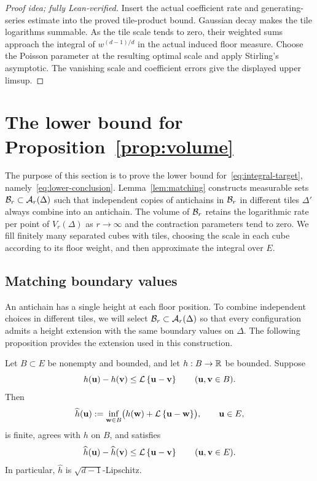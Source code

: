 \documentclass[11pt,letterpaper]{article}
\begin{document}
\begin{proof}[Proof idea; fully Lean-verified]
Insert the actual coefficient rate and generating-series estimate into the proved tile-product bound. Gaussian decay makes the tile logarithms summable. As the tile scale tends to zero, their weighted sums approach the integral of $w^{(d-1)/d}$ in the actual induced floor measure. Choose the Poisson parameter at the resulting optimal scale and apply Stirling's asymptotic. The vanishing scale and coefficient errors give the displayed upper limsup.
\end{proof}

\section{The lower bound for Proposition~\ref{prop:volume}}\label{sec:lower-bound}

The purpose of this section is to prove the lower bound for~\eqref{eq:integral-target}, namely~\eqref{eq:lower-conclusion}.
Lemma~\ref{lem:matching} constructs measurable sets $\mathcal B_r\subset\mathcal A_r(\Delta)$ such that independent copies of antichains in $\mathcal B_r$ in different tiles $\Delta'$ always combine into an antichain. The volume of $\mathcal B_r$ retains the logarithmic rate per point of $V_r(\Delta)$ as $r\to\infty$ and the contraction parameters tend to zero. We fill finitely many separated cubes with tiles, choosing the scale in each cube according to its floor weight, and then approximate the integral over $E$.

\subsection{Matching boundary values}

An antichain has a single height at each floor position. To combine independent choices in different tiles, we will select $\mathcal B_r\subset\mathcal A_r(\Delta)$ so that every configuration admits a height extension with the same boundary values on $\Delta$. The following proposition provides the extension used in this construction.


\begin{proposition}\label{prop:extension}
      Let $B\subset E$ be nonempty and bounded, and let $h:B\to\mathbb R$ be bounded. Suppose
      \begin{equation}\label{eq:height-data}
            h(\mathbf u)-h(\mathbf v)\le\mathcal L\left\{\mathbf u-\mathbf v\right\} \qquad(\mathbf u,\mathbf v\in B).
      \end{equation}
      Then
      \[
            \widehat h(\mathbf u):=\inf_{\mathbf w\in B} \bigl(h(\mathbf w)+\mathcal L\left\{\mathbf u-\mathbf w\right\}\bigr),\qquad \mathbf u\in E,
      \]
      is finite, agrees with $h$ on $B$, and satisfies
      \[
            \widehat h(\mathbf u)-\widehat h(\mathbf v)\le\mathcal L\left\{\mathbf u-\mathbf v\right\} \qquad(\mathbf u,\mathbf v\in E).
      \]
      In particular, $\widehat h$ is $\sqrt{d-1}$-Lipschitz.
\end{proposition}
\end{document}
